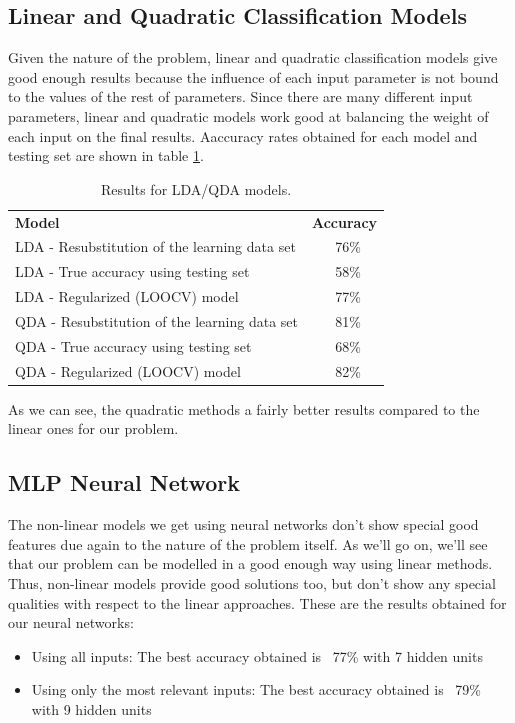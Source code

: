 \documentclass[english]{scrartcl}
\begin{document}
    \subsection{Linear and Quadratic Classification Models}
    Given the nature of the problem, linear and quadratic classification models give good enough results because the influence
    of each input parameter is not bound to the values of the rest of parameters. Since there are many different input parameters,
    linear and quadratic models work good at balancing the weight of each input on the final results. Aaccuracy rates obtained for each model and testing set are shown in table \ref{table:ldaqda-results}.
    
    \begin{table}[h]
    \centering
    \begin{tabular}{l c}
    \textbf{Model} & \textbf{Accuracy} \\
    LDA - Resubstitution of the learning data set & ~76\% \\
    LDA - True accuracy using testing set & ~58\% \\
    LDA - Regularized (LOOCV) model & ~77\% \\
    QDA - Resubstitution of the learning data set & ~81\% \\
    QDA - True accuracy using testing set & ~68\% \\
    QDA - Regularized (LOOCV) model & ~82\% \\
    \end{tabular}
    \caption{Results for LDA/QDA models.}
    \label{table:ldaqda-results}
    \end{table}
    
    As we can see, the quadratic methods a fairly better results compared to the linear ones for our problem.
    
    \subsection{MLP Neural Network}\label{sec:results:nnet}
    The non-linear models we get using neural networks don't show special good features due again to the nature of the problem itself.
    As we'll go on, we'll see that our problem can be modelled in a good enough way using linear methods. Thus, non-linear models provide
    good solutions too, but don't show any special qualities with respect to the linear approaches. These are the results obtained for
    our neural networks:
    \begin{itemize}
    \item Using all inputs: The best accuracy obtained is ~77\% with 7 hidden units
    \item Using only the most relevant inputs: The best accuracy obtained is ~79\% with 9 hidden units
    \end{itemize}
    
\end{document}
